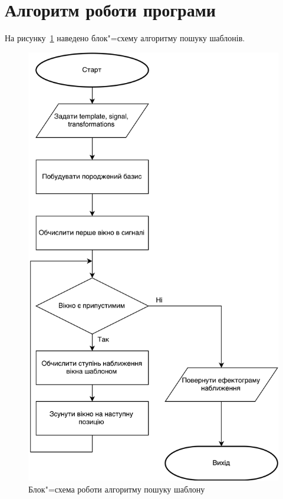 \section{Алгоритм роботи програми}
На рисунку~\ref{fig:block_scheme_monitor} наведено блок"=схему алгоритму пошуку шаблонів.
    \begin{figure}[h]
        \centering
        \includegraphics[height=0.72\textheight]{Drawing2.eps}
        \caption{Блок"=схема роботи алгоритму пошуку шаблону}
        \label{fig:block_scheme_monitor}
    \end{figure}
    \clearpage

